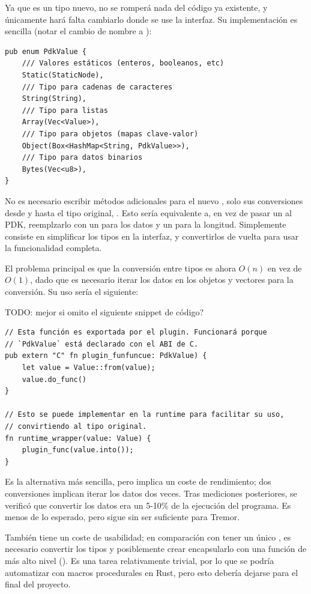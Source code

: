 Ya que es un tipo nuevo, no se romperá nada del código ya existente, y
únicamente hará falta cambiarlo donde se use la interfaz. Su implementación es
sencilla (notar el cambio de nombre a ):

\begin{verbatim}
pub enum PdkValue {
    /// Valores estáticos (enteros, booleanos, etc)
    Static(StaticNode),
    /// Tipo para cadenas de caracteres
    String(String),
    /// Tipo para listas
    Array(Vec<Value>),
    /// Tipo para objetos (mapas clave-valor)
    Object(Box<HashMap<String, PdkValue>>),
    /// Tipo para datos binarios
    Bytes(Vec<u8>),
}
\end{verbatim}

No es necesario escribir métodos adicionales para el nuevo , solo
sus conversiones desde y hasta el tipo original, . Esto sería
equivalente a, en vez de pasar un  al PDK, reemplzarlo con un
 para los datos y un  para la longitud. Simplemente
consiste en simplificar los tipos en la interfaz, y convertirlos de vuelta para
usar la funcionalidad completa.

El problema principal es que la conversión entre tipos es ahora $O(n)$ en vez de
$O(1)$, dado que es necesario iterar los datos en los objetos y vectores para la
conversión. Su uso sería el siguiente:

TODO: mejor si omito el siguiente snippet de código?

\begin{verbatim}
// Esta función es exportada por el plugin. Funcionará porque
// `PdkValue` está declarado con el ABI de C.
pub extern "C" fn plugin_funfuncue: PdkValue) {
    let value = Value::from(value);
    value.do_func()
}

// Esto se puede implementar en la runtime para facilitar su uso,
// convirtiendo al tipo original.
fn runtime_wrapper(value: Value) {
    plugin_func(value.into());
}
\end{verbatim}

Es la alternativa más sencilla, pero implica un coste de rendimiento; dos
conversiones implican iterar los datos dos veces. Tras mediciones posteriores,
se verificó que convertir los datos era un 5-10\% de la ejecución del programa.
Es menos de lo esperado, pero sigue sin ser suficiente para Tremor.

También tiene un coste de usabilidad; en comparación con tener un único
, es necesario convertir los tipos y posiblemente crear encapsularlo
con una función de más alto nivel (). Es una tarea
relativamente trivial, por lo que se podría automatizar con macros procedurales
en Rust, pero esto debería dejarse para el final del proyecto.


